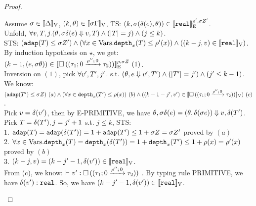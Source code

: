\documentclass[a4paper,11pt]{article}
\theoremstyle{definition}
\begin{document}
\begin{proof}
\begin{mainitem}
Assume $ \ienv \in \lrv{\Delta}$, $(\stepiA, \env) \in \lrv{\ienv \Gamma}$, TS: $(\stepiA, \ienv (\eop(\expr), \env)) \in \lre{\dmap'}{\ienv \nnatA'}{\treal}$.\\
%
Unfold, $\forall \valr, \tr, j. (\env, \ienv \eop(\expr) \bigstep \valr, \tr) \land (\size{\tr} = j) \land (j \leq \stepiA)$.\\
%
STS: $(\adap(\tr) \leq \ienv \nnatA') \land (\forall x \in \mbox{Vars}. \ddep{x}(\tr) \leq \dmap'(x)) \land ((\stepiA - j, \valr) \in \lrv{\treal})$.\\
%
By induction hypothesis on $\star$, we get: $(\stepiA-1, (\expr, \ienv \env)) \in \lre{\dmap}{\ienv \nnatA}{\tbox{  (\tarr{ \tau_1}{ \tau_2 }{0}{\dmap''}{0})}} ~ (1)$.\\
%
Inversion on $(1)$, pick $\forall \valr', \tr', j'$. s.t. $ (\env, \expr \bigstep \valr', \tr') \land (\size{\tr'} = j') \land (j' \leq \stepiA-1)$.\\
%
{\color{red}We know: $(\adap(\tr') \leq \ienv \nnatA) ~ (a)
\land (\forall x \in \ddep{x}(\tr') \leq \dmap(x)) ~ (b)
\land ((\stepiA -1- j', \valr') \in \lrv{\tbox{  (\tarr{ \tau_1}{ \tau_2 }{0}{\dmap''}{0})     }}) ~ (c)$.}\\
%
Pick $\valr = \eop(\valr')$, then by E-PRIMITIVE, we have $\env, \ienv \eop(\expr) = (\env, \eop( \ienv \expr) )  \bigstep \valr, \eop(\tr')$.\\
%
Pick $\tr = \eop(\tr'), j = j' + 1$ s.t.  $j \leq k$, STS:\\
%
1. $\adap(\tr) = \adap(\eop(\tr')) = 1 + \adap(\tr') \leq 1 + \ienv \nnatA = \ienv \nnatA'$ proved by $(a)$\\
%
2. $\forall x \in \mbox{Vars}. \ddep{x}(\tr) = \ddep{x}(\eop(\tr')) = 1 + \ddep{x}(\tr') \leq 1 + \dmap(x) = \dmap'(x)$ proved by $(b)$\\
%
{\color{red}
3. $(\stepiA - j, \valr) = (\stepiA - j' - 1, \eop(\valr')) \in \lrv{\treal} $.\\
%
From (c), we know: $\tvdash{} \valr' : \tbox{  (\tarr{ \tau_1}{ \tau_2 }{0}{\dmap''}{0}) }$ . By typing rule PRIMITIVE, we have $\eop(\valr'): \treal$. So, we have $(\stepiA - j' - 1, \eop(\valr')) \in \lrv{\treal}$.\\
%
}


\end{mainitem}
\end{proof}
\end{document}

